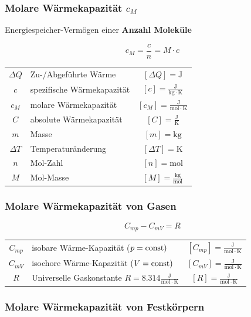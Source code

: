 \subsubsection{Molare Wärmekapazität $c_M$}
Energiespeicher-Vermögen einer \textbf{Anzahl Moleküle}

$$ \boxed{ c_M = \frac{c}{n} = M \cdot c } $$


\begin{tabular}{c l c}
	$\Delta Q$ & Zu-/Abgeführte Wärme & $[\Delta Q] = \mathrm{J}$ \\
	\rule{0pt}{8pt}$c$ & spezifische Wärmekapazität & $[c] = \mathrm{\frac{J}{kg \cdot K}}$ \\
	\rule{0pt}{8pt}$c_M$ & molare Wärmekapazität & $[c_M] = \mathrm{\frac{J}{mol \cdot K}}$ \\
	\rule{0pt}{8pt}$C$ & absolute Wärmekapazität & $[C] = \mathrm{\frac{J}{K}}$ \\
	$m$ & Masse & $[m] = \mathrm{kg}$ \\
	$\Delta T$ & Temperaturänderung & $[\Delta T] = \mathrm{K}$ \\
	$n$ & Mol-Zahl & $[n] = \mathrm{mol}$ \\
	\rule{0pt}{8pt}$M$ & Mol-Masse & $[M] = \mathrm{\frac{kg}{mol}}$ \\
\end{tabular}


\subsubsection{Molare Wärmekapazität von Gasen}

$$ \boxed{ C_{mp} - C_{mV} = R }$$


\begin{tabular}{c l c}
	\rule{0pt}{8pt}$C_{mp}$ & isobare Wärme-Kapazität ($p = \mathrm{const})$ & $[C_{mp}] = \mathrm{\frac{J}{mol \cdot K}}$ \\
	\rule{0pt}{8pt}$C_{mV}$ & isochore Wärme-Kapazität ($V = \mathrm{const})$ & $[C_{mV}] = \mathrm{\frac{J}{mol \cdot K}}$ \\
	\rule{0pt}{8pt}$R$ & Universelle Gaskonstante $R = 8.314 \mathrm{\frac{J}{mol \cdot K}}$ & $[R] = \mathrm{\frac{J}{mol \cdot K}} $ \\
\end{tabular}




\subsubsection{Molare Wärmekapazität von Festkörpern}


